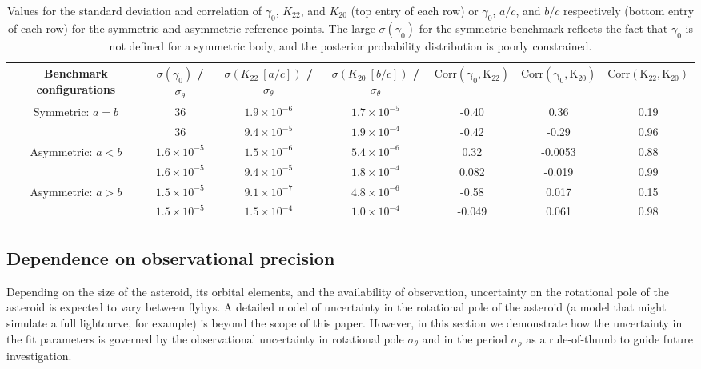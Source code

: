 \documentclass{aastex631}
\begin{document}
\begin{table}
  \centering
  \begin{tabular}{c c c c c c c}
    \hline \hline
    Benchmark configurations & $\sigma(\gamma_0)$ / $\sigma_\theta$ & $\sigma(K_{22}\ [a/c])$ / $\sigma_\theta$ & $\sigma(K_{20}\ [b/c])$ / $\sigma_\theta$ & $\mathrm{Corr(\gamma_0, K_{22})}$ & $\mathrm{Corr(\gamma_0, K_{20})}$ & $\mathrm{Corr(K_{22}, K_{20})}$ \\ \hline
    Symmetric: $a=b$ & 36 & $1.9 \times 10^{-6}$ & $1.7 \times 10^{-5}$ & -0.40 & 0.36 & 0.19\\%
    & 36 & $9.4\times 10^{-5}$ & $1.9\times 10^{-4}$ & -0.42 & -0.29 & 0.96 \\
    Asymmetric: $a<b$ & $1.6 \times 10^{-5}$ & $1.5 \times 10^{-6}$ & $5.4 \times 10^{-6}$ & 0.32 & -0.0053 & 0.88\\%
    & $1.6\times 10^{-5}$ & $9.4\times 10^{-5}$ & $1.8\times 10^{-4}$ & 0.082 & -0.019 & 0.99\\
    Asymmetric: $a>b$  & $1.5 \times 10^{-5}$ & $9.1 \times 10^{-7}$ & $4.8 \times 10^{-6}$ & -0.58 & 0.017 & 0.15 \\%
    & $1.5\times 10^{-5}$ & $1.5\times 10^{-4}$ & $1.0\times 10^{-4}$ & -0.049 & 0.061 & 0.98\\ \hline
  \end{tabular}
  \caption{Values for the standard deviation and correlation of $\gamma_0$, $K_{22}$, and $K_{20}$ (top entry of each row) or $\gamma_0$, $a/c$, and $b/c$ respectively (bottom entry of each row) for the symmetric and asymmetric reference points. The large $\sigma(\gamma_0)$ for the symmetric benchmark reflects the fact that $\gamma_0$ is not defined for a symmetric body, and the posterior probability distribution is poorly constrained.}
  \label{tab:probe-space-refernece-var-covar}
\end{table}


\subsection{Dependence on observational precision}
\label{sec:probe-sigma}

Depending on the size of the asteroid, its orbital elements, and the availability of observation, uncertainty on the rotational pole of the asteroid is expected to vary between flybys. A detailed model of uncertainty in the rotational pole of the asteroid (a model that might simulate a full lightcurve, for example) is beyond the scope of this paper. However, in this section we demonstrate how the uncertainty in the fit parameters is governed by the observational uncertainty in rotational pole $\sigma_\theta$ and in the period $\sigma_\rho$  as a rule-of-thumb to guide future investigation.
\end{document}
